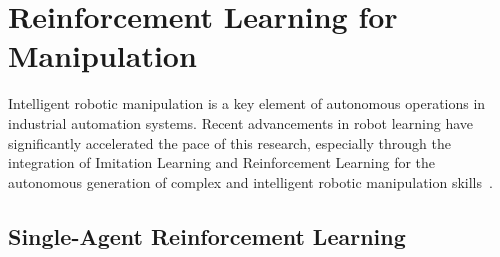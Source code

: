 \begin{table}[htbp]
\centering
\caption{Inverse kinematics solver families and their suitability for continuous trajectory tracking
on a non-spherical wrist.}
\label{tab:lit_ik}
\end{table}

\section{Reinforcement Learning for Manipulation}\label{sec:lit_rl}

Intelligent robotic manipulation is a key element of autonomous operations in industrial automation
systems. Recent advancements in robot learning have significantly accelerated the pace of this
research, especially through the integration of Imitation Learning and Reinforcement Learning for
the autonomous generation of complex and intelligent robotic manipulation
skills~\citep{zare2024survey}.

\subsection{Single-Agent Reinforcement Learning}\label{subsec:lit_single_rl}

